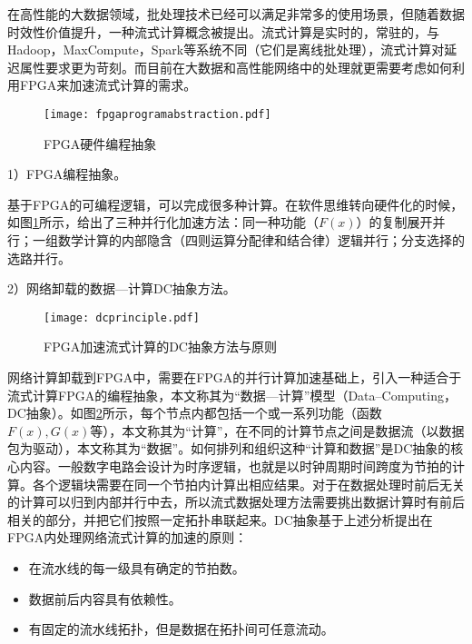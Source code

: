 
在高性能的大数据领域，批处理技术已经可以满足非常多的使用场景，但随着数据时效性价值提升，一种流式计算概念被提出。流式计算是实时的，常驻的，与Hadoop，MaxCompute，Spark等系统不同（它们是离线批处理），流式计算对延迟属性要求更为苛刻。而目前在大数据和高性能网络中的处理就更需要考虑如何利用FPGA来加速流式计算的需求。
\begin{figure}[!ht]
	\centering
	\texttt{[image: fpgaprogramabstraction.pdf]}
	\caption{FPGA硬件编程抽象} \label{fig:fpgaprogramabstraction}
\end{figure}

1）FPGA编程抽象。
		
基于FPGA的可编程逻辑，可以完成很多种计算。在软件思维转向硬件化的时候，如图\ref{fig:fpgaprogramabstraction}所示，给出了三种并行化加速方法：同一种功能（$F(x)$）的复制展开并行；一组数学计算的内部隐含（四则运算分配律和结合律）逻辑并行；分支选择的选路并行。



2）网络卸载的数据---计算DC抽象方法。

\begin{figure}[!ht]
	\centering
	\texttt{[image: dcprinciple.pdf]}
	\caption{FPGA加速流式计算的DC抽象方法与原则} \label{fig:dcprinciple}
\end{figure}

网络计算卸载到FPGA中，需要在FPGA的并行计算加速基础上，引入一种适合于流式计算FPGA的编程抽象，本文称其为“数据---计算”模型（Data--Computing，DC抽象）。如图\ref{fig:dcprinciple}所示，每个节点内都包括一个或一系列功能（函数$F(x), G(x)$等），本文称其为“计算”，在不同的计算节点之间是数据流（以数据包为驱动），本文称其为“数据”。如何排列和组织这种“计算和数据”是DC抽象的核心内容。一般数字电路会设计为时序逻辑，也就是以时钟周期时间跨度为节拍的计算。各个逻辑块需要在同一个节拍内计算出相应结果。对于在数据处理时前后无关的计算可以归到内部并行中去，所以流式数据处理方法需要挑出数据计算时有前后相关的部分，并把它们按照一定拓扑串联起来。DC抽象基于上述分析提出在FPGA内处理网络流式计算的加速的原则：

\begin{itemize}
	\item 在流水线的每一级具有确定的节拍数。
	\item 数据前后内容具有依赖性。%
	\item 有固定的流水线拓扑，但是数据在拓扑间可任意流动。
\end{itemize}

